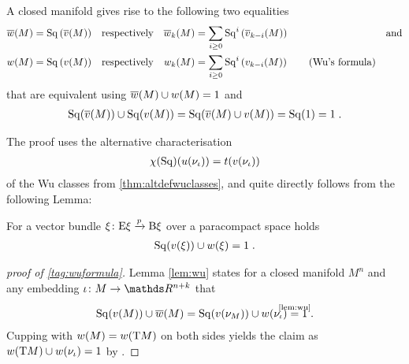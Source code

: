 \begin{Thm}[Wu]\label{thm:wu}
  A closed manifold gives rise to the following two equalities
  \begin{align}\notag
    {\overline{w}}(M) &= \mathrm{Sq}\left({\overline{v}}(M)\right)
    &\text{respectively}&
    &{\overline{w}_{k}}(M) &= \sum_{i\geq0} \mathrm{Sq}^{i}\left({\overline{v}_{k-i}}(M)\right)
    &\text{and}
    \\
    {w}(M) &= \mathrm{Sq}\left({v}(M)\right)
    &\text{respectively}&
    &{w_{k}}(M) &= \sum_{i\geq0} \mathrm{Sq}^{i}\left({v_{k-i}}(M)\right)
    \label{tag:wuformula}\tag{Wu's formula}
  \end{align}
  that are equivalent using
  ${\overline{w}}(M)\cup{w}(M) = 1$ and
  \begin{gather*}
    \mathrm{Sq}({\overline{v}}(M))\cup\mathrm{Sq}({v}(M))
    = \mathrm{Sq}({\overline{v}}(M)\cup{v}(M))
    = \mathrm{Sq}(1)
    = 1
    \;.
  \end{gather*}
\end{Thm}
The proof uses the alternative characterisation
\begin{gather*}
  \chi(\mathrm{Sq})({u}(\nu_{{\iota}})) = t({v}(\nu_{{\iota}}))
\end{gather*}
of the Wu classes from \autoref{thm:altdefwuclasses}, and quite directly
follows from the following Lemma:
\begin{Lem}\label{lem:wu}
  For a vector bundle $\xi\colon \mathrm{E}\xi\xrightarrow{p}\mathrm{B}\xi$ over a
  paracompact space holds
  \begin{gather*}
    \mathrm{Sq}({v}(\xi)) \cup {w}(\xi)= 1
    \;.
  \end{gather*}
\end{Lem}
\begin{proof}[proof of \ref{tag:wuformula}]
  Lemma \autoref{lem:wu} states for a closed manifold $M^n$ and any
  embedding $\emb\colon M\to\R^{n+k}$ that
  \begin{gather*}
    \SQ(\V{M}) \cup \dualW{M}
    = \SQ(\V{\N M}) \cup \W{\N{\emb}}
    \cequalsby{\autoref{lem:wu}} 1
    \;.
  \end{gather*}
  Cupping with ${w}(M)={w}(\mathrm{T}M)$ on both sides yields the claim
  as ${w}(\mathrm{T}M) \cup {w}(\nu_{{\iota}}) = 1$ by
  .
\end{proof}
